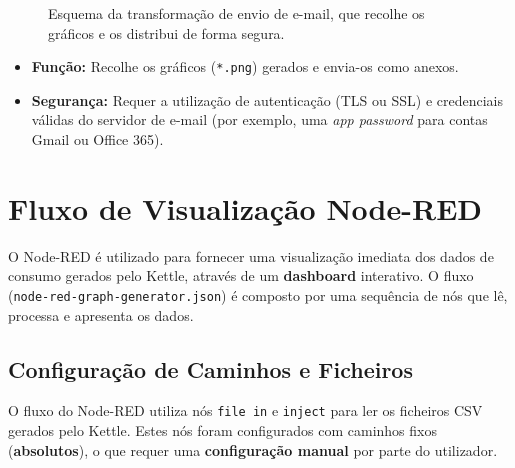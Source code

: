 \documentclass[a4paper, 12pt]{article}
\begin{document}
	\begin{figure}[h!]
		\centering
		\caption{Esquema da transformação de envio de e-mail, que recolhe os gráficos e os distribui de forma segura.}
		\label{fig:email_config}
	\end{figure}

	
	\begin{itemize}
		\item \textbf{Função:} Recolhe os gráficos (\texttt{*.png}) gerados e envia-os como anexos.
		\item \textbf{Segurança:} Requer a utilização de autenticação (TLS ou SSL) e credenciais válidas do servidor de e-mail (por exemplo, uma \textit{app password} para contas Gmail ou Office 365).
	\end{itemize}
	
	\section{Fluxo de Visualização Node-RED}
	
	O Node-RED é utilizado para fornecer uma visualização imediata dos dados de consumo gerados pelo Kettle, através de um \textbf{dashboard} interativo. O fluxo (\texttt{node-red-graph-generator.json}) é composto por uma sequência de nós que lê, processa e apresenta os dados.
	
	\subsection{Configuração de Caminhos e Ficheiros}
	O fluxo do Node-RED utiliza nós \texttt{file in} e \texttt{inject} para ler os ficheiros CSV gerados pelo Kettle. Estes nós foram configurados com caminhos fixos (\textbf{absolutos}), o que requer uma \textbf{configuração manual} por parte do utilizador.
	
\end{document}
